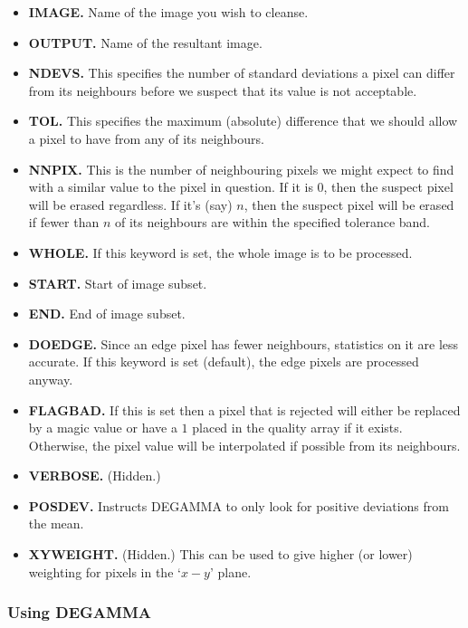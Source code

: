 \begin{itemize}
\item {\bf IMAGE.} Name of the image you wish to cleanse.
\item {\bf OUTPUT.} Name of the resultant image.
\item {\bf NDEVS.} This specifies the number of standard deviations a pixel can
differ from its neighbours before we suspect that its value is not acceptable.
\item {\bf TOL.} This specifies the maximum (absolute) difference that we should
allow a pixel to have from any of its neighbours.
\item {\bf NNPIX.} This is the number of neighbouring pixels we might expect to
find with a similar value to the pixel in question. If it is 0, then the
suspect pixel will be erased regardless. If it's (say) $n$, then the suspect
pixel will be erased if fewer than $n$ of its neighbours are within the
specified tolerance band.
\item {\bf WHOLE.} If this keyword is set, the whole image is to be processed.
\item  {\bf START.} Start of image subset.
\item {\bf END.} End of image subset.
\item {\bf DOEDGE.} Since an edge pixel has fewer neighbours, statistics on it
are less accurate. If this keyword is set (default), the edge pixels are
processed anyway.
\item {\bf FLAGBAD.} If this is set then a pixel that is rejected will either
be replaced by a magic value or have a $1$ placed in the quality array if it
exists. Otherwise, the pixel value will be interpolated if possible from its
neighbours.
\item {\bf VERBOSE.} (Hidden.)
\item {\bf POSDEV.} Instructs DEGAMMA to only look for positive deviations from
the mean.
\item {\bf XYWEIGHT.} (Hidden.) This can be used to give higher (or lower)
weighting for pixels in the `$x-y$' plane. 
\end{itemize}

\subsubsection{Using DEGAMMA}

